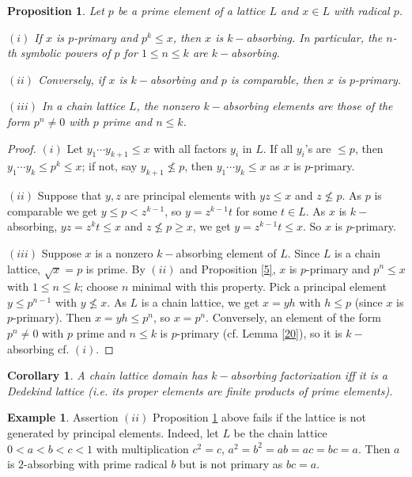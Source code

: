 \documentclass{amsart}
\theoremstyle{plain}
\newtheorem{corollary}[theorem]{Corollary}
\newtheorem{proposition}[theorem]{Proposition}
\theoremstyle{definition}
\newtheorem{example}[theorem]{Example}
\theoremstyle{remark}
\begin{document}
 
\begin{proposition}\label{6}    %
Let $p$ be a prime element  of a lattice $L$ and $x\in L$ with radical $p$. 

$(i)$ If $x$ is $p$-primary and $p^k \leq x$, then $x$ is $k-$absorbing.
In particular, the $n$-th  symbolic powers of $p$  for $1\leq n\leq k$     are $k-$absorbing.

$(ii)$ Conversely, if  $x$ is $k-$absorbing and $p$ is comparable, then $x$ is $p$-primary.

$(iii)$ In a  chain lattice $L$, the nonzero  $k-$absorbing elements are those of  the form $p^n\neq 0$ with $p$  prime    and $n\leq k$.
\end{proposition}
\begin{proof}
$(i)$ Let $y_1\cdots y_{k+1}\leq x$ with all factors $y_i$ in $L$. If all $y_i$'s are $\leq p$, then $y_1\cdots y_{k}\leq p^k \leq x$; if not, say $y_{k+1}\not\leq p$, then $y_1\cdots y_{k}\leq x$ as $x$ is $p$-primary. 

$(ii)$ Suppose that  $y,z$ are principal elements with $yz\leq x$ and $z\not\leq p$. As $p$ is comparable we get $y\leq p< z^{k-1}$, so $y=z^{k-1}t$ for some  $t\in L$.  As $x$ is $k-$absorbing, $yz=z^kt\leq x$ and $z\not\leq p\geq x$,
 we get $y=z^{k-1}t\leq x$. So $x$ is $p$-primary. 
 
 $(iii)$ Suppose $x$ is a nonzero $k-$absorbing element of $L$. Since $L$ is a chain lattice, $\sqrt{x}=p$ is prime.
 By $(ii)$ and Proposition \ref{5}, $x$ is $p$-primary and $p^n\leq x$ with $1\leq n\leq k$; choose   $n$ minimal with this property.
Pick a principal element $y\leq p^{n-1}$ with $y\not\leq x$. As $L$ is a chain lattice, we get $x=yh$ with $h\leq p$ (since $x$ is $p$-primary). Then  $x=yh\leq p^n$, so $x=p^n$. Conversely, an element of the form $p^n\neq 0$ with $p$  prime    and $n\leq k$
is $p$-primary (cf. Lemma \ref{20}), so it is $k-$absorbing cf. $(i)$.
\end{proof}




\begin{corollary}
A chain lattice domain has $k-$absorbing factorization iff it is a Dedekind lattice (i.e. its proper elements are finite products of prime elements).
\end{corollary}





\begin{example}
Assertion $(ii)$ Proposition \ref{6} above fails if the lattice is not generated by principal elements. Indeed, let
$L$  be the chain lattice $0< a < b < c < 1$ with multiplication 
$c^2=c$, $a^2=b^2=ab=ac=bc=a$.
Then  $a$ is $2$-absorbing with prime radical $b$ but is not primary as $bc=a$.
\end{example}
\end{document}
